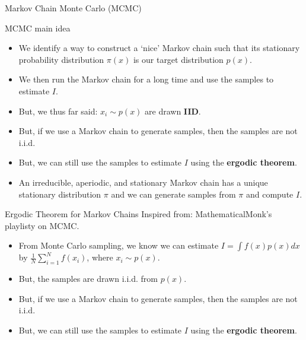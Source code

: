 \documentclass{beamer}
\begin{document}
\begin{section}{Markov Chain Monte Carlo (MCMC)}

    \begin{frame}{MCMC main idea}
        \begin{itemize}
            \item We identify a way to construct a `nice' Markov chain such that its stationary probability distribution $\pi(x)$ is our target distribution $p(x)$.
            \item We then run the Markov chain for a long time and use the samples to estimate $I$.
            \item But, we thus far said: $x_i \sim p(x)$ are drawn \textbf{IID}. 
            \item But, if we use a Markov chain to generate samples, then the samples are not i.i.d.
            \item But, we can still use the samples to estimate $I$ using the \textbf{ergodic theorem}.
            \item An irreducible, aperiodic, and stationary Markov chain has a unique stationary distribution $\pi$ and we can generate samples from $\pi$ and compute $I$.
        \end{itemize}
    \end{frame}
    


    \begin{frame}{Ergodic Theorem for Markov Chains}
        Inspired from: MathematicalMonk's playlisty on MCMC.

        \begin{itemize}
            \item From Monte Carlo sampling, we know we can estimate $I = \int f(x) p(x) dx$ by $\frac{1}{N} \sum_{i=1}^N f(x_i)$, where $x_i \sim p(x)$.
            \item But, the samples are drawn i.i.d. from $p(x)$.
            \item But, if we use a Markov chain to generate samples, then the samples are not i.i.d.
            \item But, we can still use the samples to estimate $I$ using the \textbf{ergodic theorem}.
        \end{itemize}
    \end{frame}



\end{section}
\end{document}
